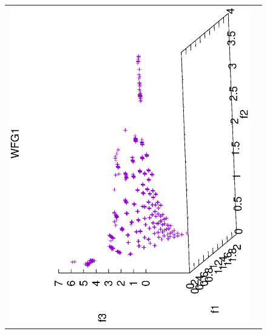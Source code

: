 \begin{figure}[H]
\begin{tabular}{cc}
  \includegraphics[scale=0.3, angle=-90,origin=c]{Figures_Chapter7/Results_Chapter4/Summary_Representative/VSD-MOEA-D/WFG1.eps}  \\

\end{tabular}
\end{figure}
